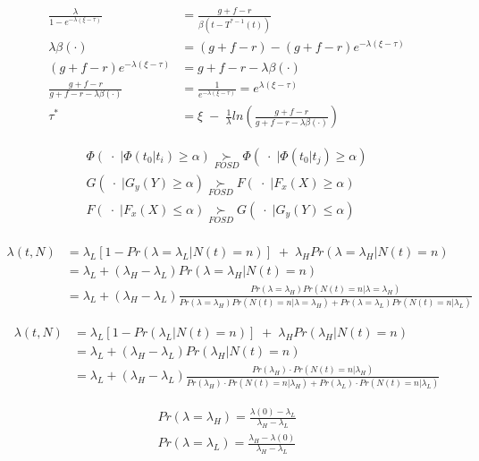 \documentclass[14pt]{article}
\begin{document}
\begin{align}
\frac{\lambda} {1 - e^{-\lambda(\xi - \tau)}} &= \frac{g+f-r} {\beta (t - T^{*-1}(t))} \\
\lambda \beta( \cdot ) &= (g + f -r)  - (g+f-r) e^{-\lambda(\xi - \tau )} \\
(g+f-r)e^{-\lambda(\xi - \tau) } &= g+f-r - \lambda \beta( \cdot) \\
\frac{g+f-r}{g+f-r-\lambda \beta( \cdot)} &= \frac{1}{e^{-\lambda(\xi - \tau) }} = e^{\lambda(\xi - \tau) } \\
\tau^* &= \xi \; - \; \frac{1}{\lambda} ln \left(  \frac{g+f-r}{g+f-r-\lambda\beta(\cdot)} \right)
\end{align}



\begin{align}
\Phi(\; \cdot \; | \Phi(t_0|t_i) \ge \alpha) \underset{FOSD}\succ \Phi(\; \cdot \; | \Phi(t_0|t_j) \ge \alpha) \\
G(\; \cdot \; | G_y(Y) \ge \alpha) \underset{FOSD}\succ F(\; \cdot \; | F_x(X) \ge \alpha) \\
F(\; \cdot \; | F_x(X) \le \alpha)  \underset{FOSD}\succ  G(\; \cdot \; | G_y(Y) \le \alpha)\\
\end{align}


\begin{align*}
\lambda(t, N) &= \lambda_L [1- Pr(\lambda=\lambda_L | N(t)=n )] \; + \; \lambda_H Pr(\lambda=\lambda_H|N(t)=n) \\
&=   \lambda_L + (\lambda_H - \lambda_L) Pr(\lambda=\lambda_H|N(t)=n) \\
&=  \lambda_L + (\lambda_H - \lambda_L) \frac{ Pr(\lambda=\lambda_H) Pr(N(t)=n|\lambda=\lambda_H)} { Pr(\lambda=\lambda_H)Pr(N(t)=n|\lambda=\lambda_H) + Pr(\lambda=\lambda_L)Pr(N(t)=n|\lambda_L)   }
\end{align*}


\begin{align*}
\lambda(t, N) &= \lambda_L [1- Pr(\lambda_L | N(t)=n )] \; + \; \lambda_H Pr(\lambda_H|N(t)=n) \\
&=   \lambda_L + (\lambda_H - \lambda_L) Pr(\lambda_H|N(t)=n) \\
&=  \lambda_L + (\lambda_H - \lambda_L) \frac{ Pr(\lambda_H) \cdot Pr(N(t)=n|\lambda_H)} { Pr(\lambda_H) \cdot Pr(N(t)=n|\lambda_H) + Pr(\lambda_L) \cdot Pr(N(t)=n|\lambda_L)   }
\end{align*}


\begin{align*}
Pr(\lambda=\lambda_H) = \frac{\lambda(0) - \lambda_L} {\lambda_H - \lambda_L} \\
Pr(\lambda=\lambda_L) = \frac{\lambda_H - \lambda(0)} {\lambda_H - \lambda_L}
\end{align*}
\end{document}
